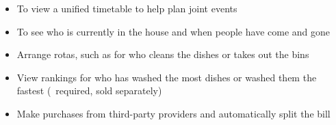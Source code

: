 \begin{itemize}
    \item To view a unified timetable to help plan joint events
    \item To see who is currently in the house and when people have come and gone
    \item Arrange rotas, such as for who cleans the dishes or takes out the bins
    \item View rankings for who has washed the most dishes or washed them the fastest (\sshCamera\ required, sold separately)
    \item Make purchases from third-party providers and automatically split the bill
\end{itemize}
